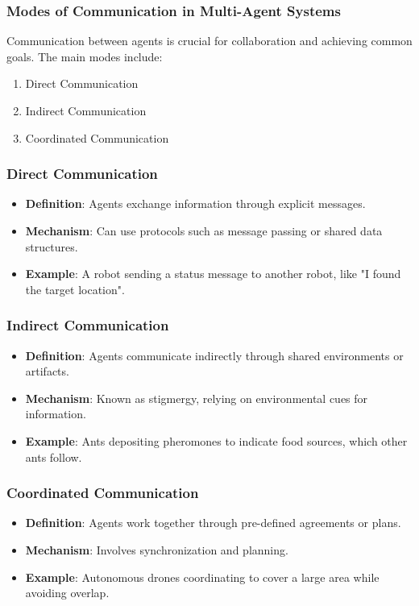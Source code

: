 \documentclass[aspectratio=169]{beamer}
\begin{document}
\begin{frame}[fragile]
    \frametitle{Modes of Communication in Multi-Agent Systems}
    Communication between agents is crucial for collaboration and achieving common goals. The main modes include:
    \begin{enumerate}
        \item Direct Communication
        \item Indirect Communication
        \item Coordinated Communication
    \end{enumerate}
\end{frame}

\begin{frame}[fragile]
    \frametitle{Direct Communication}
    \begin{itemize}
        \item \textbf{Definition}: Agents exchange information through explicit messages.
        \item \textbf{Mechanism}: Can use protocols such as message passing or shared data structures.
        \item \textbf{Example}: A robot sending a status message to another robot, like "I found the target location".
    \end{itemize}
\end{frame}

\begin{frame}[fragile]
    \frametitle{Indirect Communication}
    \begin{itemize}
        \item \textbf{Definition}: Agents communicate indirectly through shared environments or artifacts.
        \item \textbf{Mechanism}: Known as stigmergy, relying on environmental cues for information.
        \item \textbf{Example}: Ants depositing pheromones to indicate food sources, which other ants follow.
    \end{itemize}
\end{frame}

\begin{frame}[fragile]
    \frametitle{Coordinated Communication}
    \begin{itemize}
        \item \textbf{Definition}: Agents work together through pre-defined agreements or plans.
        \item \textbf{Mechanism}: Involves synchronization and planning.
        \item \textbf{Example}: Autonomous drones coordinating to cover a large area while avoiding overlap.
    \end{itemize}
\end{frame}
\end{document}
